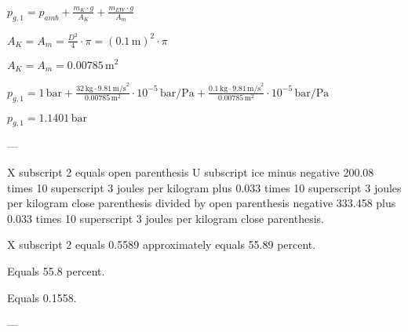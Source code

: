 \( p_{g,1} = p_{amb} + \frac{m_K \cdot g}{A_K} + \frac{m_{EW} \cdot g}{A_m} \)  

\( A_K = A_m = \frac{D^2}{4} \cdot \pi = (0.1 \, \text{m})^2 \cdot \pi \)  

\( A_K = A_m = 0.00785 \, \text{m}^2 \)  

\( p_{g,1} = 1 \, \text{bar} + \frac{32 \, \text{kg} \cdot 9.81 \, \text{m/s}^2}{0.00785 \, \text{m}^2} \cdot 10^{-5} \, \text{bar/Pa} + \frac{0.1 \, \text{kg} \cdot 9.81 \, \text{m/s}^2}{0.00785 \, \text{m}^2} \cdot 10^{-5} \, \text{bar/Pa} \)  

\( p_{g,1} = 1.1401 \, \text{bar} \)  

---

X subscript 2 equals open parenthesis U subscript ice minus negative 200.08 times 10 superscript 3 joules per kilogram plus 0.033 times 10 superscript 3 joules per kilogram close parenthesis divided by open parenthesis negative 333.458 plus 0.033 times 10 superscript 3 joules per kilogram close parenthesis.  

X subscript 2 equals 0.5589 approximately equals 55.89 percent.  

Equals 55.8 percent.  

Equals 0.1558.  

---